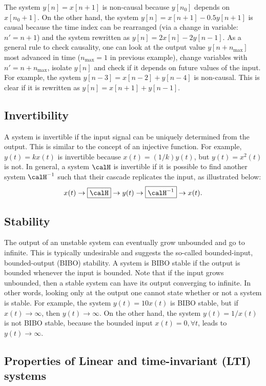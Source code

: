The system $y[n]=x[n+1]$ is non-causal because $y[n_0]$ depends on $x[n_0+1]$. On the other hand, the system $y[n]=x[n+1]-0.5y[n+1]$ is causal because the time index can be rearranged (via a change in variable: $n'=n+1$) and the system rewritten as $y[n]=2x[n]-2y[n-1]$. As a general rule to check causality, one can look at the output value $y[n+n_{\textrm{max}}]$ most advanced in time ($n_{\textrm{max}}=1$ in previous example), change variables with $n'=n+n_{\textrm{max}}$, isolate $y[n]$ and check if it depends on future values of the input. For example, the system $y[n-3]=x[n-2]+y[n-4]$ is non-causal. This is clear if it is rewritten as $y[n]=x[n+1]+y[n-1]$.

\subsection{Invertibility}

A system is invertible if the input signal can be uniquely determined from the output. This is similar to the concept of an injective function. For example, $y(t)= k x(t)$ is invertible because $x(t) = (1/k) y(t)$, but $y(t)=x^2(t)$ is not.
In general, a system $\calH$ is invertible if it is possible to find another system $\calH^{-1}$ such that their cascade replicates the input, as illustrated below:
\[
x(t) \rightarrow\boxed{\calH}\rightarrow  y(t) \rightarrow\boxed{\calH^{-1}}\rightarrow  x(t).
\]

\subsection{Stability}

The output of an unstable system can eventually grow unbounded and go to infinite.
This is typically undesirable and suggests the so-called bounded-input, bounded-output (BIBO) stability. A system is BIBO stable if the output is bounded whenever the input is bounded. Note that if the input grows unbounded, then a stable system can have its output converging to infinite. In other words, looking only at the output one cannot state whether or not a system is stable. For example, the system $y(t)=10 x(t)$ is BIBO stable, but if $x(t) \rightarrow \infty$, then $y(t) \rightarrow \infty$. On the other hand, the system $y(t)=1/x(t)$ is not BIBO stable, because the bounded input $x(t)=0, \forall t$, leads to $y(t) \rightarrow \infty$.

\subsection{Properties of Linear and time-invariant (LTI) systems}
\label{sec:LTIproperties}

